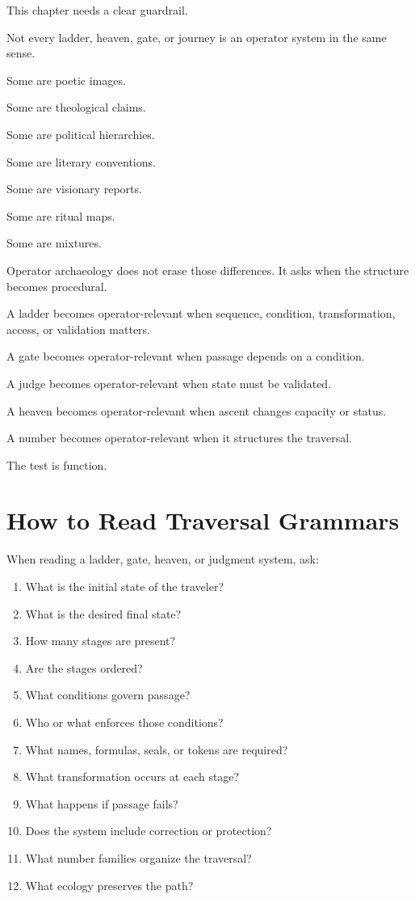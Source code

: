 \documentclass[11pt]{book}
\begin{document}
This chapter needs a clear guardrail.

Not every ladder, heaven, gate, or journey is an operator system in the same sense.

Some are poetic images.

Some are theological claims.

Some are political hierarchies.

Some are literary conventions.

Some are visionary reports.

Some are ritual maps.

Some are mixtures.

Operator archaeology does not erase those differences. It asks when the structure becomes procedural.

A ladder becomes operator-relevant when sequence, condition, transformation, access, or validation matters.

A gate becomes operator-relevant when passage depends on a condition.

A judge becomes operator-relevant when state must be validated.

A heaven becomes operator-relevant when ascent changes capacity or status.

A number becomes operator-relevant when it structures the traversal.

The test is function.

\section{How to Read Traversal Grammars}

When reading a ladder, gate, heaven, or judgment system, ask:

\begin{enumerate}[label=\arabic*.]
    \item What is the initial state of the traveler?
    \item What is the desired final state?
    \item How many stages are present?
    \item Are the stages ordered?
    \item What conditions govern passage?
    \item Who or what enforces those conditions?
    \item What names, formulas, seals, or tokens are required?
    \item What transformation occurs at each stage?
    \item What happens if passage fails?
    \item Does the system include correction or protection?
    \item What number families organize the traversal?
    \item What ecology preserves the path?
\end{enumerate}
\end{document}
